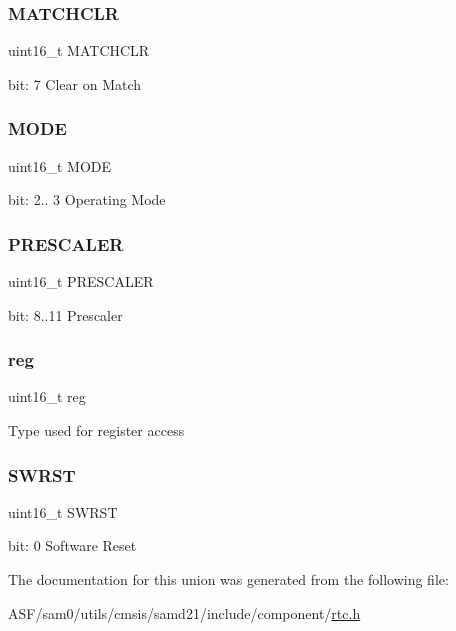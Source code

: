 \subsubsection{\texorpdfstring{MATCHCLR}{MATCHCLR}}
{\footnotesize\ttfamily uint16\+\_\+t M\+A\+T\+C\+H\+C\+LR}

bit\+: 7 Clear on Match \mbox{\label{union_r_t_c___m_o_d_e0___c_t_r_l___type_abd348ee828aadd0781f3fa97d167e564}} 
\subsubsection{\texorpdfstring{MODE}{MODE}}
{\footnotesize\ttfamily uint16\+\_\+t M\+O\+DE}

bit\+: 2.. 3 Operating Mode \mbox{\label{union_r_t_c___m_o_d_e0___c_t_r_l___type_a30db59a1afd851a8a4acd5d8605ca6ba}} 
\subsubsection{\texorpdfstring{PRESCALER}{PRESCALER}}
{\footnotesize\ttfamily uint16\+\_\+t P\+R\+E\+S\+C\+A\+L\+ER}

bit\+: 8..11 Prescaler \mbox{\label{union_r_t_c___m_o_d_e0___c_t_r_l___type_a11760f5020019f4aa8cb02e694f7cc44}} 
\subsubsection{\texorpdfstring{reg}{reg}}
{\footnotesize\ttfamily uint16\+\_\+t reg}

Type used for register access \mbox{\label{union_r_t_c___m_o_d_e0___c_t_r_l___type_a4987fcca11694bd2ffae6a773a9bfc24}} 
\subsubsection{\texorpdfstring{SWRST}{SWRST}}
{\footnotesize\ttfamily uint16\+\_\+t S\+W\+R\+ST}

bit\+: 0 Software Reset 

The documentation for this union was generated from the following file\+:\begin{DoxyCompactItemize}
\item 
A\+S\+F/sam0/utils/cmsis/samd21/include/component/\mbox{\hyperlink{component_2rtc_8h}{rtc.\+h}}\end{DoxyCompactItemize}
